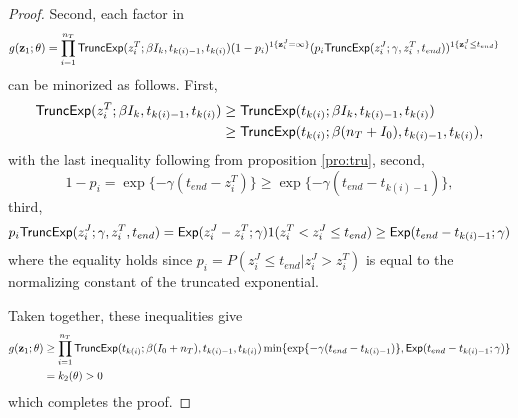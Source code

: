 \documentclass[11pt]{article}
\begin{document}
\begin{proof}
	Second, each factor in
	\begin{align*}
		& g(\mathbf{z}_1; \theta) = \prod_{i=1}^{n_T} \textsf{TruncExp}(z^T_i; \beta I_k, t_{k(i)-1}, t_{k(i)}) (1-p_i)^{1\{\mathbf{z}^J_i = \infty\}} (p_i \textsf{TruncExp}(z^J_i; \gamma, z^T_i, t_{end}))^{1\{\mathbf{z}^J_i \le t_{end}\}}
	\end{align*}
	can be minorized as follows. First,
	\begin{align*}
		\textsf{TruncExp}(z^T_i; \beta I_k, t_{k(i)-1}, t_{k(i)}) 
		& \ge \textsf{TruncExp}(t_{k(i)}; \beta I_k, t_{k(i)-1}, t_{k(i)}) \\
		& \ge \textsf{TruncExp}(t_{k(i)}; \beta (n_T + I_0), t_{k(i)-1}, t_{k(i)}),
	\end{align*}
	with the last inequality following from proposition \ref{pro:tru}, second,
	$$1-p_i = \exp\{-\gamma (t_{end} - z^T_i)\} \ge \exp\{-\gamma (t_{end} - t_{k(i)-1})\},$$
	third,
	$$p_i \textsf{TruncExp}(z^J_i; \gamma, z^T_i, t_{end}) = \textsf{Exp}(z^J_i - z^T_i; \gamma)1(z^T_i < z^J_i \le t_{end}) \ge \textsf{Exp}(t_{end} - t_{k(i) - 1}; \gamma)$$
	where the equality holds since $p_i = P(z^J_i \le t_{end}|z^J_i > z^T_i)$ is equal to the normalizing constant of the truncated exponential.
	
	Taken together, these inequalities give
	\begin{align*}
		g(\mathbf{z}_1; \theta)
		& \ge \prod_{i=1}^{n_T} \textsf{TruncExp}(t_{k(i)}; \beta (I_0 + n_T), t_{k(i)-1}, t_{k(i)}) \min\{\exp\{-\gamma (t_{end} - t_{k(i) - 1})\}, \textsf{Exp}(t_{end} - t_{k(i) - 1}; \gamma)\} \\
		& = k_2(\theta) > 0
	\end{align*}
	which completes the proof.
\end{proof}
			
	
	
		
\end{document}
